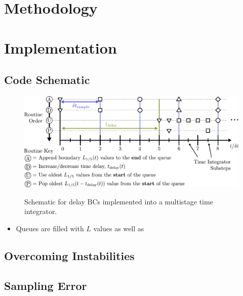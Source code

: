 \section{Methodology}

\section{Implementation}


\subsection{Code Schematic}

\begin{figure}[h]
\centering
\includegraphics[scale=0.6]{assets/imgs/delay_bc_code_schematic.pdf}
\label{fig:schematic}
\caption{Schematic for delay BCs implemented into a multistage time integrator. }
\end{figure}


\begin{itemize}
\item Queues are filled with $L$ values as well as 
\end{itemize}



\subsection{Overcoming Instabilities}



\subsection{Sampling Error}




